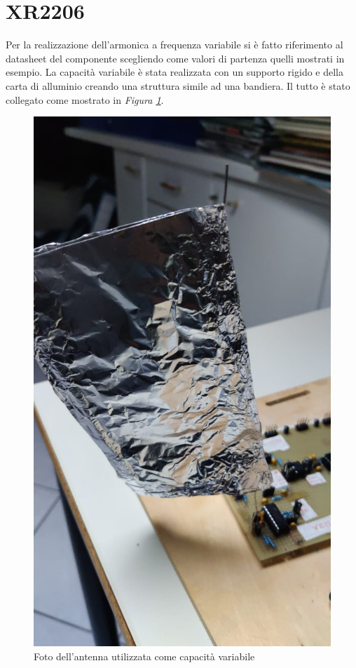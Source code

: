 \documentclass[titlepage]{report}
\begin{document}
\section{XR2206}
	Per la realizzazione dell'armonica a frequenza variabile si è fatto riferimento al datasheet del componente scegliendo come valori di partenza quelli mostrati in esempio. 
	La capacità variabile è stata realizzata con un supporto rigido e della carta di alluminio creando una struttura simile ad una bandiera. Il tutto è stato collegato come mostrato in \textit{Figura \ref{fig:antenna}}.

	\begin{figure}[H]
		\centering
		\includegraphics[scale=0.25]{Immagini/Antenna.jpg}
		\caption{Foto dell'antenna utilizzata come capacità variabile}
		\label{fig:antenna}
	\end{figure}
	
\end{document}
